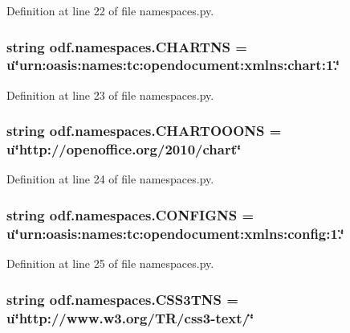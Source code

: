Definition at line 22 of file namespaces.\+py.

\hypertarget{namespaceodf_1_1namespaces_abcad86ac6d4ff8db343d42fe9d81cf69}{
\subsubsection[{C\+H\+A\+R\+T\+N\+S}]{\setlength{\rightskip}{0pt plus 5cm}string odf.\+namespaces.\+C\+H\+A\+R\+T\+N\+S = u\char`\"{}urn\+:oasis\+:names\+:tc\+:opendocument\+:xmlns\+:chart\+:1.\char`\"{}}}\label{namespaceodf_1_1namespaces_abcad86ac6d4ff8db343d42fe9d81cf69}


Definition at line 23 of file namespaces.\+py.

\hypertarget{namespaceodf_1_1namespaces_a94cf86979bbde22bd25d4a867f6329df}{
\subsubsection[{C\+H\+A\+R\+T\+O\+O\+O\+N\+S}]{\setlength{\rightskip}{0pt plus 5cm}string odf.\+namespaces.\+C\+H\+A\+R\+T\+O\+O\+O\+N\+S = u\char`\"{}http\+://openoffice.\+org/2010/chart\char`\"{}}}\label{namespaceodf_1_1namespaces_a94cf86979bbde22bd25d4a867f6329df}


Definition at line 24 of file namespaces.\+py.

\hypertarget{namespaceodf_1_1namespaces_aa10cc99f2e65577ec7fa203cf7c7be34}{
\subsubsection[{C\+O\+N\+F\+I\+G\+N\+S}]{\setlength{\rightskip}{0pt plus 5cm}string odf.\+namespaces.\+C\+O\+N\+F\+I\+G\+N\+S = u\char`\"{}urn\+:oasis\+:names\+:tc\+:opendocument\+:xmlns\+:config\+:1.\char`\"{}}}\label{namespaceodf_1_1namespaces_aa10cc99f2e65577ec7fa203cf7c7be34}


Definition at line 25 of file namespaces.\+py.

\hypertarget{namespaceodf_1_1namespaces_a72fa2c70a996fefada2f9b239b2a3847}{
\subsubsection[{C\+S\+S3\+T\+N\+S}]{\setlength{\rightskip}{0pt plus 5cm}string odf.\+namespaces.\+C\+S\+S3\+T\+N\+S = u\char`\"{}http\+://www.\+w3.\+org/T\+R/css3-\/text/\char`\"{}}}\label{namespaceodf_1_1namespaces_a72fa2c70a996fefada2f9b239b2a3847}



